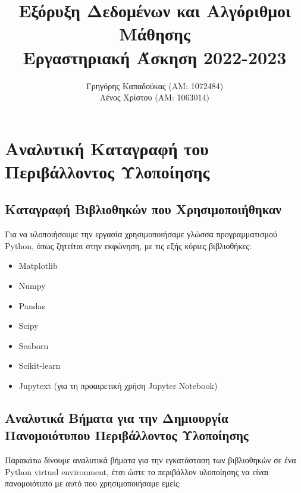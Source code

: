 \documentclass[12pt,a4paper]{article}
\title{Εξόρυξη Δεδομένων και Αλγόριθμοι Μάθησης\\Εργαστηριακή Άσκηση 2022-2023}
\author{Γρηγόρης Καπαδούκας (ΑΜ: 1072484)\\Λένος Χρίστου (ΑΜ: 1063014)}
\begin{document}
\maketitle

\section{Αναλυτική Καταγραφή του Περιβάλλοντος Υλοποίησης}

\subsection{Καταγραφή Βιβλιοθηκών που Χρησιμοποιήθηκαν}
Για να υλοποιήσουμε την εργασία χρησιμοποιήσαμε γλώσσα προγραμματισμού Python, όπως ζητείται στην εκφώνηση, με τις εξής κύριες βιβλιοθήκες:

\begin{itemize}
    \item Matplotlib
    \item Numpy
    \item Pandas
    \item Scipy
    \item Seaborn
    \item Scikit-learn
    \item Jupytext (για τη προαιρετική χρήση Jupyter Notebook)
\end{itemize}

\subsection{Αναλυτικά Βήματα για την Δημιουργία Πανομοιότυπου Περιβάλλοντος Υλοποίησης}
Παρακάτω δίνουμε αναλυτικά βήματα για την εγκατάσταση των βιβλιοθηκών σε ένα Python virtual environment, έτσι ώστε το περιβάλλον υλοποίησης να είναι πανομοιότυπο με αυτό που χρησιμοποιήσαμε εμείς:
\end{document}
